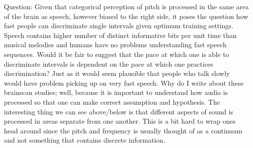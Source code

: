 Question: Given that categorical perception of pitch is processed in the same area of the brain as speech, however biased to the right side, it poses the question how fast people can discriminate single intervals given optimum training settings. Speech contains higher number of distinct informative bits per unit time than musical melodies and humans have no problems understanding fast speech sequences. Would it be fair to suggest that the pace at which one is able to discriminate intervals is dependent on the pace at which one practices discrimination? Just as it would seem plausible that people who talk slowly would have problem picking up on very fast speech.
Why do I write about these brainscan studies; well, because it is important to understand how audio is processed so that one can make correct assumption and hypothesis. The interesting thing we can see above/below is that different aspects of sound is processed in areas separate from one another. This is a bit hard to wrap ones head around since the pitch and frequency is usually thought of as a continuum and not something that contains discrete information.


